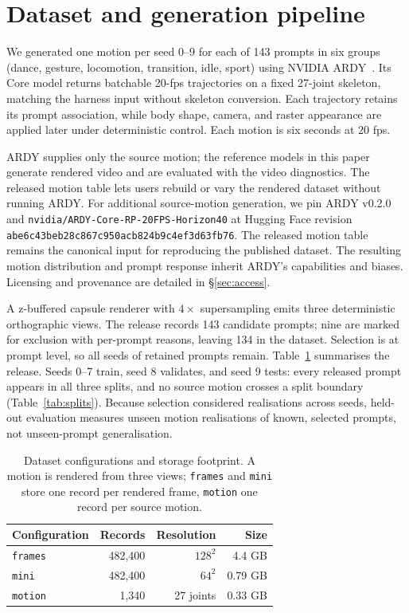 \documentclass[10pt,twocolumn]{article}
\begin{document}
\section{Dataset and generation pipeline}\label{sec:data}
We generated one motion per seed 0--9 for each of 143 prompts in six groups (dance, gesture, locomotion,
transition, idle, sport) using NVIDIA ARDY~\cite{zhao2026ardy}. Its Core model returns batchable 20-fps
trajectories on a fixed 27-joint skeleton, matching the harness input without skeleton conversion. Each
trajectory retains its prompt association, while body shape, camera, and raster appearance are applied
later under deterministic control. Each motion is six seconds at 20 fps.

ARDY supplies only the source motion; the reference models in this paper generate rendered video and are
evaluated with the video diagnostics. The released motion table lets users rebuild or vary the rendered
dataset without running ARDY. For additional source-motion generation, we pin ARDY v0.2.0 and
\texttt{nvidia/ARDY-Core-RP-20FPS-Horizon40} at Hugging Face revision
\texttt{abe6c43beb28c867c950acb824b9c4ef3d63fb76}. The released motion table remains the canonical input for
reproducing the published dataset. The resulting motion distribution and prompt response inherit ARDY's
capabilities and biases. Licensing and provenance are detailed in \S\ref{sec:access}.

A z-buffered capsule renderer with $4\times$ supersampling emits three deterministic orthographic views.
The release records 143 candidate prompts; nine are marked for exclusion with per-prompt reasons, leaving
134 in the dataset. Selection is at prompt level, so all seeds of retained prompts remain. Table~\ref{tab:data} summarises the release. Seeds 0--7 train, seed
8 validates, and seed 9 tests: every released prompt appears in all three splits, and no source motion
crosses a split boundary (Table~\ref{tab:splits}). Because selection considered realisations across seeds,
held-out evaluation measures unseen motion realisations of known, selected prompts, not unseen-prompt
generalisation.

\begin{table}[t]\centering\caption{Dataset configurations and storage footprint. A motion is rendered from three views; \texttt{frames} and
\texttt{mini} store one record per rendered frame, \texttt{motion} one record per source
motion.}\label{tab:data}\small
\begin{tabular}{@{}lrrr@{}}\toprule Configuration & Records & Resolution & Size \\\midrule
\texttt{frames} & 482,400 & $128^2$ & 4.4 GB \\
\texttt{mini} & 482,400 & $64^2$ & 0.79 GB \\
\texttt{motion} & 1,340 & 27 joints & 0.33 GB \\\bottomrule\end{tabular}\end{table}
\end{document}
